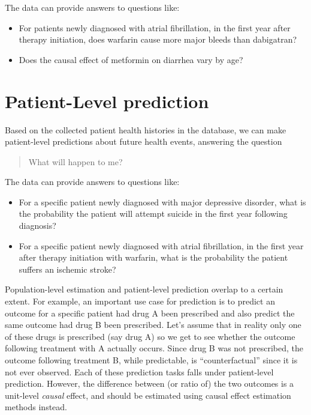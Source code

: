\documentclass[11pt]{book}
\providecommand{\tightlist}{%
  \setlength{\itemsep}{0pt}\setlength{\parskip}{0pt}}
\theoremstyle{definition}
\theoremstyle{definition}
\theoremstyle{definition}
\theoremstyle{remark}
\begin{document}
The data can provide answers to questions like:

\begin{itemize}
\tightlist
\item
  For patients newly diagnosed with atrial fibrillation, in the first year after therapy initiation, does warfarin cause more major bleeds than dabigatran?
\item
  Does the causal effect of metformin on diarrhea vary by age?
\end{itemize}

\hypertarget{patient-level-prediction}{%
\section{Patient-Level prediction}\label{patient-level-prediction}}

Based on the collected patient health histories in the database, we can make patient-level predictions about future health events, answering the question

\begin{quote}
What will happen to me?
\end{quote}

The data can provide answers to questions like:

\begin{itemize}
\tightlist
\item
  For a specific patient newly diagnosed with major depressive disorder, what is the probability the patient will attempt suicide in the first year following diagnosis?
\item
  For a specific patient newly diagnosed with atrial fibrillation, in the first year after therapy initiation with warfarin, what is the probability the patient suffers an ischemic stroke?
\end{itemize}

Population-level estimation and patient-level prediction overlap to a certain extent. For example, an important use case for prediction is to predict an outcome for a specific patient had drug A been prescribed and also predict the same outcome had drug B been prescribed. Let's assume that in reality only one of these drugs is prescribed (say drug A) so we get to see whether the outcome following treatment with A actually occurs. Since drug B was not prescribed, the outcome following treatment B, while predictable, is ``counterfactual'' since it is not ever observed. Each of these prediction tasks falls under patient-level prediction. However, the difference between (or ratio of) the two outcomes is a unit-level \emph{causal} effect, and should be estimated using causal effect estimation methods instead.
\end{document}
